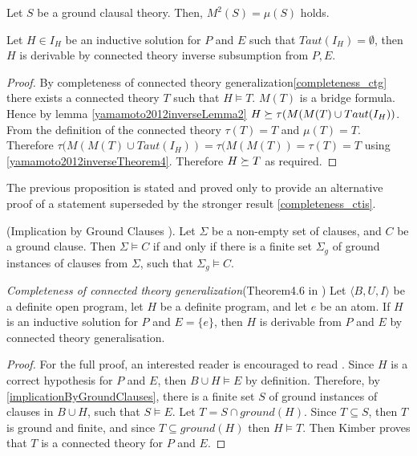 \begin{thm}\label{yamamoto2012inverseTheorem4}\cite{yamamoto2012inverse}
Let $S$ be a ground clausal theory. Then, $M^2(S) = \mu(S)$ holds.
\end{thm}

\begin{proposition}
Let $H \in I_H$ be an inductive solution for $P$ and $E$ such that $Taut(I_H)=\emptyset$, then $H$ is derivable by connected theory inverse subsumption from $P, E$.
\end{proposition}
\begin{proof}
By completeness of connected theory generalization\ref{completeness_ctg} there exists a connected theory $T$ such that $H \models T$. $M(T)$ is a bridge formula.
Hence by lemma \ref{yamamoto2012inverseLemma2}
$H \succeq \tau(M(M(T) \cup Taut(I_H))$. From the definition of the connected theory $\tau(T)=T$ and $\mu (T)=T$.
Therefore $\tau(M(M(T) \cup Taut(I_H))=\tau(M(M(T))=\tau(T)=T$ using
\ref{yamamoto2012inverseTheorem4}. Therefore $H \succeq T$ as required.
\end{proof}
\begin{remark}
The previous proposition is stated and proved only to provide an alternative proof of a statement superseded by the stronger result \ref{completeness_ctis}.
\end{remark}

\begin{thm}\label{implicationByGroundClauses}
(Implication by Ground Clauses \cite{nienhuys1997foundations}). Let $\Sigma$ be a non-empty set of clauses,
and $C$ be a ground clause. Then $\Sigma \models C$ if and only if there is a finite set $\Sigma_g$ of ground
instances of clauses from $\Sigma$, such that $\Sigma_g \models C$.
\end{thm}

\begin{thm}\label{completeness_ctg}
\emph{Completeness of connected theory generalization}(Theorem4.6 in \cite{kimber2012learning})
Let $\langle B, U, I \rangle$ be a definite open program,
let $H$ be a definite program, and let $e$ be an atom.
If $H$ is an inductive solution for $P$ and
$E = \{e\}$, then $H$ is derivable from $P$ and $E$ by connected theory generalisation.
\end{thm}
\begin{proof}\cite{kimber2012learning}
For the full proof, an interested reader is encouraged to read \cite{kimber2012learning}.
Since $H$ is a correct hypothesis for $P$ and $E$,
then $B \cup H \models E$ by definition.
Therefore, by \ref{implicationByGroundClauses}, there is a finite set $S$ of ground instances of clauses in $B \cup H$,
such that $S \models E$. Let $T = S \cap ground(H)$.
Since $T \subseteq S$, then $T$ is ground and finite, and
since $T \subseteq ground(H)$ then $H \models T$. 
Then Kimber proves that $T$ is a connected theory for $P$ and $E$.
\end{proof}

